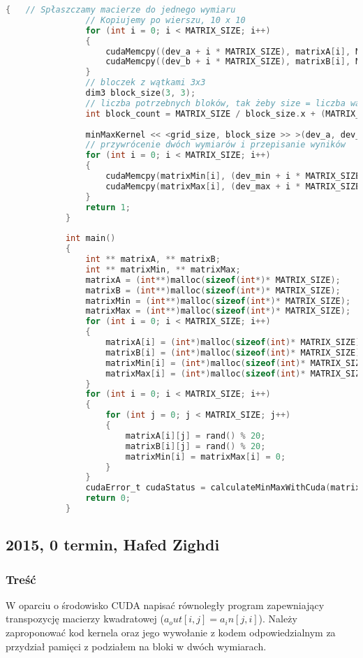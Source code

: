 			\begin{lstlisting}[language=C]
			{	// Spłaszczamy macierze do jednego wymiaru
				// Kopiujemy po wierszu, 10 x 10
				for (int i = 0; i < MATRIX_SIZE; i++)
				{
					cudaMemcpy((dev_a + i * MATRIX_SIZE), matrixA[i], MATRIX_SIZE * sizeof(int), cudaMemcpyHostToDevice);
					cudaMemcpy((dev_b + i * MATRIX_SIZE), matrixB[i], MATRIX_SIZE * sizeof(int), cudaMemcpyHostToDevice);
				}
				// bloczek z wątkami 3x3
				dim3 block_size(3, 3);
				// liczba potrzebnych bloków, tak żeby size = liczba wątków
				int block_count = MATRIX_SIZE / block_size.x + (MATRIX_SIZE % block_size.x == 0 ? 0 : 1);
				
				minMaxKernel << <grid_size, block_size >> >(dev_a, dev_b, dev_min, dev_max);
				// przywrócenie dwóch wymiarów i przepisanie wyników
				for (int i = 0; i < MATRIX_SIZE; i++)
				{
					cudaMemcpy(matrixMin[i], (dev_min + i * MATRIX_SIZE), MATRIX_SIZE * sizeof(int), cudaMemcpyDeviceToHost);
					cudaMemcpy(matrixMax[i], (dev_max + i * MATRIX_SIZE), MATRIX_SIZE * sizeof(int), cudaMemcpyDeviceToHost);
				}
				return 1;
			}
			
			int main()
			{
				int ** matrixA, ** matrixB;
				int ** matrixMin, ** matrixMax;
				matrixA = (int**)malloc(sizeof(int*)* MATRIX_SIZE);
				matrixB = (int**)malloc(sizeof(int*)* MATRIX_SIZE);
				matrixMin = (int**)malloc(sizeof(int*)* MATRIX_SIZE);
				matrixMax = (int**)malloc(sizeof(int*)* MATRIX_SIZE);
				for (int i = 0; i < MATRIX_SIZE; i++)
				{
					matrixA[i] = (int*)malloc(sizeof(int)* MATRIX_SIZE);
					matrixB[i] = (int*)malloc(sizeof(int)* MATRIX_SIZE);
					matrixMin[i] = (int*)malloc(sizeof(int)* MATRIX_SIZE);
					matrixMax[i] = (int*)malloc(sizeof(int)* MATRIX_SIZE);
				}
				for (int i = 0; i < MATRIX_SIZE; i++)
				{
					for (int j = 0; j < MATRIX_SIZE; j++)
					{
						matrixA[i][j] = rand() % 20;
						matrixB[i][j] = rand() % 20;
						matrixMin[i] = matrixMax[i] = 0;
					}
				}
				cudaError_t cudaStatus = calculateMinMaxWithCuda(matrixA, matrixB, matrixMin, matrixMax);
				return 0;
			}
		\end{lstlisting}
	\newpage
	\subsection{2015, 0 termin, Hafed Zighdi}
		\subsubsection{Treść}
			W oparciu o środowisko CUDA napisać równoległy program zapewniający transpozycję macierzy kwadratowej ($ a_out[ i,j ] = a_in [ j,i ] $). Należy zaproponować kod kernela oraz jego wywołanie z kodem odpowiedzialnym za przydział pamięci z podziałem na bloki w dwóch wymiarach.
